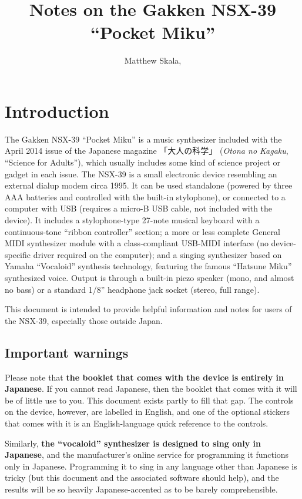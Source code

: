 \documentclass[titlepage]{article}
\title{Notes on the Gakken NSX-39 ``Pocket Miku''}
\author{Matthew Skala,
}
\begin{document}
\maketitle


\section{Introduction}

The Gakken NSX-39 ``Pocket Miku'' is a music synthesizer included with the
April 2014 issue of the Japanese magazine {\mincho 「大人の科学」}
(\textit{Otona no Kagaku}, ``Science for Adults''), which usually includes
some kind of science project or gadget in each issue.  The NSX-39 is a small
electronic device resembling an external dialup modem circa 1995.  It can be
used standalone (powered by three AAA batteries and controlled with the
built-in stylophone), or connected to a computer with USB (requires a
micro-B USB cable, not included with the device).  It includes a
stylophone-type 27-note musical keyboard with a continuous-tone ``ribbon
controller'' section; a more or less complete General MIDI synthesizer
module with a class-compliant USB-MIDI interface (no device-specific driver
required on the computer); and a singing synthesizer based on Yamaha
``Vocaloid'' synthesis technology, featuring the famous ``Hatsune Miku''
synthesized voice.  Output is through a built-in piezo speaker (mono, and
almost no bass) or a standard 1/8'' headphone jack socket (stereo, full
range).

This document is intended to provide helpful information and notes for
users of the NSX-39, especially those outside Japan.

\subsection{Important warnings}

Please note that \textbf{the booklet that comes with the device is entirely
in Japanese}.  If you cannot read Japanese, then the booklet that comes with
it will be of little use to you.  This document exists partly to fill that
gap.  The controls on the device, however, are labelled in English, and one
of the optional stickers that comes with it is an English-language quick
reference to the controls.

Similarly, \textbf{the ``vocaloid'' synthesizer is designed to sing only in
Japanese}, and the manufacturer's online service for programming it
functions only in Japanese.  Programming it to sing in any language other
than Japanese is tricky (but this document and the associated software
should help), and the results will be so heavily Japanese-accented as
to be barely comprehensible.
\end{document}

